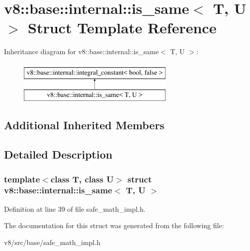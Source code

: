 \hypertarget{structv8_1_1base_1_1internal_1_1is__same}{}\section{v8\+:\+:base\+:\+:internal\+:\+:is\+\_\+same$<$ T, U $>$ Struct Template Reference}
\label{structv8_1_1base_1_1internal_1_1is__same}
Inheritance diagram for v8\+:\+:base\+:\+:internal\+:\+:is\+\_\+same$<$ T, U $>$\+:\begin{figure}[H]
\begin{center}
\leavevmode
\includegraphics[height=2.000000cm]{structv8_1_1base_1_1internal_1_1is__same}
\end{center}
\end{figure}
\subsection*{Additional Inherited Members}


\subsection{Detailed Description}
\subsubsection*{template$<$class T, class U$>$\newline
struct v8\+::base\+::internal\+::is\+\_\+same$<$ T, U $>$}



Definition at line 39 of file safe\+\_\+math\+\_\+impl.\+h.



The documentation for this struct was generated from the following file\+:\begin{DoxyCompactItemize}
\item 
v8/src/base/safe\+\_\+math\+\_\+impl.\+h\end{DoxyCompactItemize}
